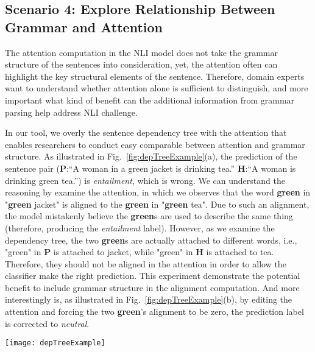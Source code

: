 \subsection{Scenario 4: Explore Relationship Between Grammar and Attention}
The attention computation in the NLI model does not take the grammar structure of the sentences into consideration,
yet, the attention often can highlight the key structural elements of the sentence. 
Therefore, domain experts want to understand whether attention alone is sufficient to distinguish, 
and more important what kind of benefit can the additional information from grammar parsing help address NLI challenge.

In our tool, we overly the sentence dependency tree with the attention that enables researchers to conduct easy comparable between attention and grammar structure.
As illustrated in Fig.~\ref{fig:depTreeExample}(a), the prediction of the sentence pair (\textbf{P}:``A woman in a green jacket is drinking tea.'' \textbf{H}:``A woman is drinking green tea.'') is \emph{entailment}, which is wrong. We can understand the reasoning by examine the attention, in which we observes that the word \textbf{green} in "\textbf{green} jacket" is aligned to the \textbf{green} in "\textbf{green} tea". Due to such an alignment, the model mistakenly believe the \textbf{green}s are used to describe the same thing (therefore, producing the \emph{entailment} label).  However, as we examine the dependency tree, the two \textbf{green}s are actually attached to different words, i.e., "green" in \textbf{P} is attached to jacket, while "green" in \textbf{H} is attached to tea. Therefore, they should not be aligned in the attention in order to allow the classifier make the right prediction.
%
This experiment demonstrate the potential benefit to include grammar structure in the alignment computation. %
%
And more interestingly is, as illustrated in Fig.~\ref{fig:depTreeExample}(b), by editing the attention and forcing the two \textbf{green}'s alignment to be zero, the prediction label is corrected to \emph{neutral}. 


\begin{figure*}[t]
\centering
\vspace{-2mm}
 \texttt{[image: depTreeExample]}
 \caption{
Dependency tree.
 }
\label{fig:depTreeExample}
\end{figure*}

